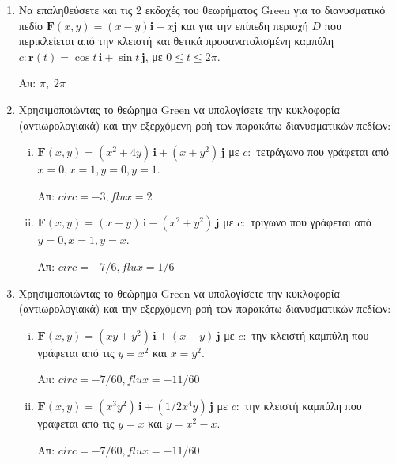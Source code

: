 \begin{enumerate}
  \item Να επαληθεύσετε και τις 2 εκδοχές του θεωρήματος Green για το διανυσματικό πεδίο 
    $ \mathbf{F}(x,y) = (x-y)\mathbf{i}+ x\mathbf{j} $ και για την επίπεδη περιοχή $D$ 
    που περικλείεται από την κλειστή και θετικά προσανατολισμένη καμπύλη 
    $ c \colon \mathbf{r}(t)= \cos{t}\, \mathbf{i} + \sin{t}\, \mathbf{j} $, με 
    $ 0 \leq t \leq 2 \pi $.

    \hfill Απ: $ \pi, \; 2 \pi  $ 

  \item Χρησιμοποιώντας το θεώρημα Green να υπολογίσετε την κυκλοφορία (αντιωρολογιακά) 
    και την εξερχόμενη ροή των παρακάτω διανυσματικών πεδίων: 
    \begin{enumerate}[i)]
      \item $ \mathbf{F}(x,y) = (x^{2}+4y) \,\mathbf{i} + (x+y^{2}) \,\mathbf{j} $ 
        με $ c \colon $ τετράγωνο που γράφεται από $ x=0, x=1, y=0, y=1 $. 
        
        \hfill Απ: $ circ = -3, flux=2 $  
      \item $ \mathbf{F}(x,y) = (x+y) \,\mathbf{i}- (x^{2}+y^{2}) \,\mathbf{j} $ 
        με $ c \colon $ τρίγωνο που γράφεται από $ y=0, x=1, y=x $.

        \hfill Απ: $ circ = -7/6, flux= 1/6$  
    \end{enumerate}

  \item Χρησιμοποιώντας το θεώρημα Green να υπολογίσετε την κυκλοφορία (αντιωρολογιακά) 
    και την εξερχόμενη ροή των παρακάτω διανυσματικών πεδίων: 
    \begin{enumerate}[i)]
      \item $ \mathbf{F}(x,y) = (xy+y^{2}) \,\mathbf{i} + (x-y) \,\mathbf{j} $ 
        με $ c \colon $ την κλειστή καμπύλη που γράφεται από τις $ y=x^{2} $ και 
        $ x = y^{2} $.  

        \hfill Απ: $ circ = -7/60, flux= -11/60$  

      \item $ \mathbf{F}(x,y) = (x^{3}y^{2}) \,\mathbf{i} + (1/2x^{4}y) \,\mathbf{j} $ 
        με $ c \colon $ την κλειστή καμπύλη που γράφεται από τις $ y=x $ και 
        $ y = x^{2}-x $.  

        \hfill Απ: $ circ = -7/60, flux= -11/60$  
    \end{enumerate}


\end{enumerate}
